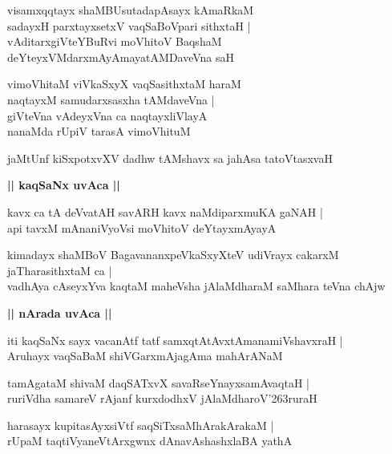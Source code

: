 \documentclass[twoside,12pt,openright]{book}
\def\S{\char'263}
\newcounter{shloka}[chapter]
\def\uvaca#1{\centerline{{\large\textbf{#1}}}}
\begin{document}
\begin{shloka}%
visamxqqtayx shaMBUsutadapAsayx kAmaRkaM \\
sadayxH parxtayxsetxV vaqSaBoVpari sithxtaH |\\
vAditarxgiVteYBuRvi moVhitoV BaqshaM \\
deYteyxVMdarxmAyAmayatAMDaveVna saH 
\end{shloka}

\begin{shloka}%
vimoVhitaM viVkaSxyX vaqSasithxtaM haraM \\
naqtayxM samudarxsasxha tAMdaveVna |\\
giVteVna vAdeyxVna ca naqtayxliVlayA \\
nanaMda rUpiV tarasA vimoVhituM 
\end{shloka}

\begin{shloka}%
jaMtUnf kiSxpotxvXV dadhw tAMshavx sa jahAsa tatoVtasxvaH 
\end{shloka}

\uvaca{|| kaqSaNx uvAca ||}

\begin{shloka}%
kavx ca tA deVvatAH savARH kavx naMdiparxmuKA gaNAH |\\
api tavxM mAnaniVyoVsi moVhitoV deYtayxmAyayA 
\end{shloka}

\begin{shloka}%
kimadayx shaMBoV BagavananxpeVkaSxyXteV udiVrayx cakarxM jaTharasithxtaM ca |\\
vadhAya cAseyxYva kaqtaM maheVsha jAlaMdharaM saMhara teVna chAjw
\end{shloka}

\uvaca{|| nArada uvAca ||}

\begin{shloka}%
iti kaqSaNx sayx vacanAtf tatf samxqtAtAvxtAmanamiVshavxraH |\\
Aruhayx vaqSaBaM shiVGarxmAjagAma mahArANaM 
\end{shloka}

\begin{shloka}%
tamAgataM shivaM daqSATxvX savaRseYnayxsamAvaqtaH |\\
ruriVdha samareV rAjanf kurxdodhxV jAlaMdharoV\S ruraH 
\end{shloka}

\begin{shloka}%
harasayx kupitasAyxsiVtf saqSiTxsaMhArakArakaM |\\
rUpaM taqtiVyaneVtArxgwnx dAnavAshashxlaBA yathA 
\end{shloka}
\end{document}
